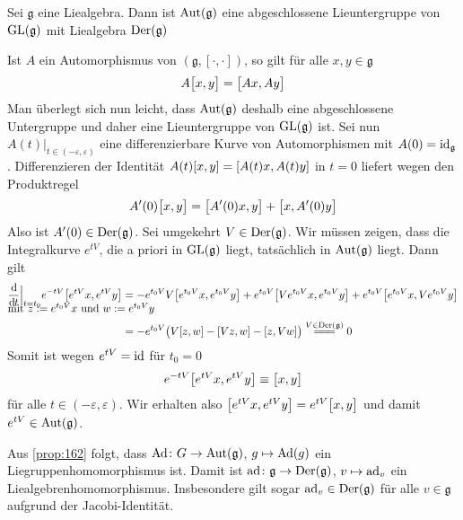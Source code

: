 \begin{proposition}[label=prop:162,{name=[Automorphismen sind Liegruppe, Derivationen die zugehörige Liealgebra]}]
	Sei $\mathfrak{g}$ eine Liealgebra.
	Dann ist $\Aut(\mathfrak{g})$ eine abgeschlossene Lieuntergruppe von $\GL(\mathfrak{g})$ mit Liealgebra $\Der(\mathfrak{g})$
\end{proposition}
\begin{beweis}
	Ist $A$ ein Automorphismus von $(\mathfrak{g},[\cdot ,\cdot ])$, so gilt für alle $x,y \in  \mathfrak{g}$
	\[
		A \benbrace[\big]{x,y} = \benbrace[\big]{A x, A y}
	\]
	Man überlegt sich nun leicht, dass $\Aut(\mathfrak{g})$ deshalb eine abgeschlossene Untergruppe und daher eine Lieuntergruppe von $\GL(\mathfrak{g})$ ist.
	Sei nun $A(t)\big|_{t \in (-\varepsilon,\varepsilon)}$ eine differenzierbare Kurve von Automorphismen mit $A(0) = {\id_{\mathfrak{g}}}$.
	Differenzieren der Identität
	\(
		A(t) \benbrace*{x,y} = \benbrace*{A(t) x, A(t) y}
	\)
	in $t=0$ liefert wegen den Produktregel
	\[
		A'(0) \benbrace[\big]{x,y} = \benbrace[\big]{A'(0) x,y} + \benbrace[\big]{x, A'(0)y}
	\]
	Also ist $A'(0) \in \Der(\mathfrak{g})$.
	Sei umgekehrt $V \in \Der(\mathfrak{g})$.
	Wir müssen zeigen, dass die Integralkurve $e^{t V}$, die a priori in $\GL(\mathfrak{g})$ liegt, tatsächlich in $\Aut(\mathfrak{g})$ liegt.
	Dann gilt
	\begin{align}
		\diffd{}{t}\Big|_{t=t_0} e^{-tV} \benbrace*{e^{tV}x, e^{tV}y} &= - e^{t_0 V} V \benbrace*{e^{t_0 V} x, e^{t_0 V} y} + e^{t_0 V} \benbrace*{V e^{t_0 V} x, e^{t_0 V} y} + e^{t_0 V} \benbrace*{e^{t_0 V} x , V e^{t_0 V} y} \\[-1em]
		\shortintertext{mit $z := e^{t_0 V} x$ und $w := e^{t_0 V}y$}
		&= - e^{t_0 V} \enbrace[\big]{V \benbrace*{z,w} - \benbrace*{Vz,w} - \benbrace*{z,Vw}} \stackrel{V \in \Der(\mathfrak{g})}{=\joinrel=\joinrel=} 0
	\end{align}
	Somit ist wegen $e^{tV}={\id}$ für $t_0=0$
	\[
		e^{-tV} \benbrace*{e^{tV}x, e^{tV}y} \equiv \benbrace[\big]{x,y}
	\]
	für alle $t \in (-\varepsilon,\varepsilon)$.
	Wir erhalten also $\benbrace*{e^{tV}x, e^{tV}y}= e^{tV}\benbrace[\big]{x,y}$ und damit $e^{tV} \in \Aut(\mathfrak{g})$.
\end{beweis}

Aus \autoref{prop:162} folgt, dass $\Ad \colon G  \to \Aut(\mathfrak{g})$, $g \mapsto \Ad(g)$ ein Liegruppenhomomorphismus ist. 
Damit ist $\ad \colon \mathfrak{g} \to \Der(\mathfrak{g})$, $v \mapsto \ad_v$ ein Liealgebrenhomomorphismus.
Insbesondere gilt sogar $\ad_v \in \Der(\mathfrak{g})$ für alle $v \in \mathfrak{g}$ aufgrund der Jacobi-Identität.

